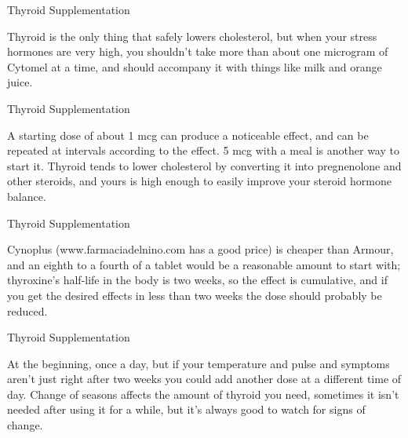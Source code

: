 \documentclass[11pt,oneside,openany,extrafontsizes]{memoir}
\begin{document}
\begin{standalonequote}{Thyroid Supplementation}

    \begin{answer}
        Thyroid is the only thing that safely lowers cholesterol, but when your stress hormones are very high, you shouldn't take more than about one microgram of Cytomel at a time, and should accompany it with things like milk and orange juice.
    \end{answer}
\end{standalonequote}

\begin{standalonequote}{Thyroid Supplementation}

    \begin{answer}
        A starting dose of about 1 mcg can produce a noticeable effect, and can be repeated at intervals according to the effect. 5 mcg with a meal is another way to start it. Thyroid tends to lower cholesterol by converting it into pregnenolone and other steroids, and yours is high enough to easily improve your steroid hormone balance.
    \end{answer}
\end{standalonequote}

\begin{standalonequote}{Thyroid Supplementation}

    \begin{answer}
        Cynoplus (www.farmaciadelnino.com has a good price) is cheaper than Armour, and an eighth to a fourth of a tablet would be a reasonable amount to start with; thyroxine's half-life in the body is two weeks, so the effect is cumulative, and if you get the desired effects in less than two weeks the dose should probably be reduced.
    \end{answer}
\end{standalonequote}

\begin{standalonequote}{Thyroid Supplementation}

    \begin{answer}
        At the beginning, once a day, but if your temperature and pulse and symptoms aren't just right after two weeks you could add another dose at a different time of day. Change of seasons affects the amount of thyroid you need, sometimes it isn't needed after using it for a while, but it's always good to watch for signs of change.
    \end{answer}
\end{standalonequote}
\end{document}
